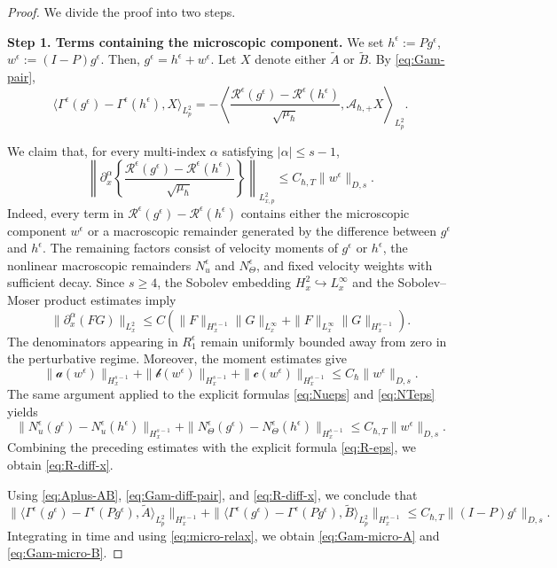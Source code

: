 \documentclass[10pt,reqno]{amsart}
\numberwithin{equation}{section}
\newcommand{\lt}{\left}
\newcommand{\rt}{\right}
\newcommand{\lal}{\langle}
\newcommand{\ral}{\rangle}
\newcommand{\bq}{\begin{equation}}
\newcommand{\eq}{\end{equation}}
\newcommand{\calA}{\mathcal A}
\newcommand{\calR}{\mathcal R}
\begin{document}
\begin{proof}
We divide the proof into two steps.

\medskip
\noindent
\textbf{Step 1. Terms containing the microscopic component.}
We set $h^\epsilon := P g^\epsilon$, $w^\epsilon := (I-P)g^\epsilon$. Then, $g^\epsilon = h^\epsilon + w^\epsilon$. Let $X$ denote either $\widetilde A $ or $\widetilde B $. By \eqref{eq:Gam-pair},
\bq\label{eq:Gam-diff-pair}
\lal \Gamma^\epsilon ( g^\epsilon ) - \Gamma^\epsilon ( h^\epsilon ), X \ral_{L^2_p} = - \lt\lal \frac{ \calR^\epsilon ( g^\epsilon ) - \calR^\epsilon ( h^\epsilon ) }{ \sqrt{\mu_\hbar} }, \calA_{\hbar,+}X \rt\ral_{L^2_p}.
\eq

We claim that, for every multi-index $\alpha$ satisfying
$|\alpha|\le s-1$,
\bq\label{eq:R-diff-x}
\lt\| \partial_x^\alpha \lt\{ \frac{ \calR^\epsilon ( g^\epsilon ) - \calR^\epsilon ( h^\epsilon ) }{ \sqrt{\mu_\hbar} } \rt\} \rt\|_{L^2_{x,p}} \le C_{\hbar,T} \| w^\epsilon \|_{D,s}.
\eq
Indeed, every term in $\calR^\epsilon(g^\epsilon)-\calR^\epsilon(h^\epsilon)$ contains either the microscopic component $w^\epsilon$ or a macroscopic remainder generated by the difference between $g^\epsilon$ and $h^\epsilon$. The remaining factors consist of velocity moments of $g^\epsilon$ or $h^\epsilon$, the nonlinear
macroscopic remainders $N^\epsilon_u$ and $N^\epsilon_\Theta$, and fixed velocity weights with sufficient decay. Since $s\ge4$, the Sobolev embedding $H^2_x \hookrightarrow L^\infty_x$ and the Sobolev--Moser product estimates imply
\[
\| \partial_x^\alpha (FG) \|_{L^2_x} \le C \lt( \| F \|_{H^{s-1}_x} \| G \|_{L^\infty_x} + \| F \|_{L^\infty_x} \| G \|_{H^{s-1}_x} \rt).
\]
The denominators appearing in $R^\epsilon_1$ remain uniformly bounded away from zero in the perturbative regime. Moreover, the moment estimates give
\[
\| \mathscr a ( w^\epsilon ) \|_{H^{s-1}_x} + \| \mathscr b ( w^\epsilon ) \|_{H^{s-1}_x} + \| \mathscr c ( w^\epsilon ) \|_{H^{s-1}_x} \le C_\hbar \| w^\epsilon \|_{D,s}.
\]
The same argument applied to the explicit formulas \eqref{eq:Nueps} and \eqref{eq:NTeps} yields
\[
\| N^\epsilon_u ( g^\epsilon ) - N^\epsilon_u ( h^\epsilon ) \|_{H^{s-1}_x} + \| N^\epsilon_\Theta ( g^\epsilon ) - N^\epsilon_\Theta ( h^\epsilon ) \|_{H^{s-1}_x} \le C_{\hbar,T} \| w^\epsilon \|_{D,s}.
\]
Combining the preceding estimates with the explicit formula \eqref{eq:R-eps}, we obtain \eqref{eq:R-diff-x}.

Using \eqref{eq:Aplus-AB}, \eqref{eq:Gam-diff-pair}, and \eqref{eq:R-diff-x}, we conclude that
\[
\| \lal \Gamma^\epsilon ( g^\epsilon ) - \Gamma^\epsilon ( P g^\epsilon ), \widetilde A  \ral_{L^2_p} \|_{H^{s-1}_x} + \| \lal \Gamma^\epsilon ( g^\epsilon ) - \Gamma^\epsilon ( P g^\epsilon ), \widetilde B  \ral_{L^2_p} \|_{H^{s-1}_x} \le C_{\hbar,T} \| (I-P)g^\epsilon \|_{D,s}.
\]
Integrating in time and using \eqref{eq:micro-relax}, we obtain \eqref{eq:Gam-micro-A} and \eqref{eq:Gam-micro-B}.


\end{proof}
\end{document}
